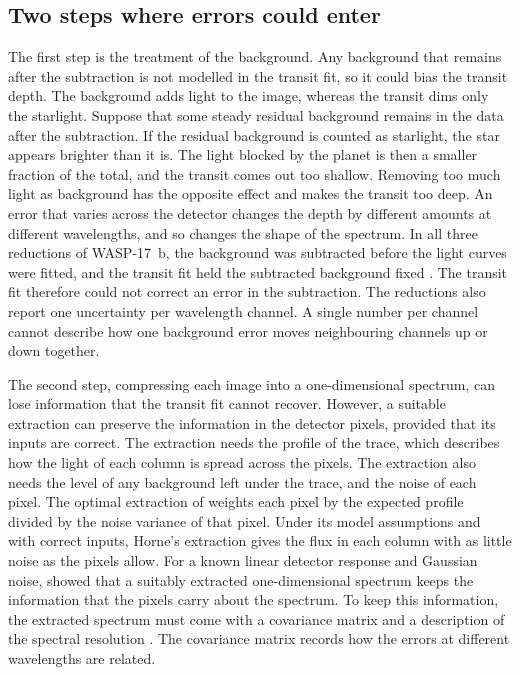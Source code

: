\subsection{Two steps where errors could enter}
\label{sec:structural-limitations}

The first step is the treatment of the background. Any background that remains after the subtraction is not modelled in the transit fit, so it could bias the transit depth. The background adds light to the image, whereas the
transit dims only the starlight. Suppose that some steady residual background
remains in the data after the subtraction. If the residual background is
counted as starlight, the star appears brighter than it is. The light blocked
by the planet is then a smaller fraction of the total, and the transit comes
out too shallow. Removing too much light as background has the opposite
effect and makes the transit too deep. An error that varies across the
detector changes the depth by different amounts at different wavelengths, and
so changes the shape of the spectrum. In all three reductions of WASP-17~b,
the background was subtracted before the light curves were fitted, and the
transit fit held the subtracted background fixed \citep{LouieEtAl2025}. The
transit fit therefore could not correct an error in the subtraction. The
reductions also report one uncertainty per wavelength channel. A single
number per channel cannot describe how one background error moves
neighbouring channels up or down together.

The second step, compressing each image into a one-dimensional spectrum, can
lose information that the transit fit cannot recover. However, a suitable
extraction can preserve the information in the detector pixels, provided that
its inputs are correct. The extraction needs the profile of the trace, which
describes how the light of each column is spread across the pixels. The extraction also needs the level of any background left under the trace, and the noise of each pixel. The optimal
extraction of \citet{Horne1986} weights each pixel by the expected profile
divided by the noise variance of that pixel. Under its model assumptions and
with correct inputs, Horne's extraction gives the flux in each column with as
little noise as the pixels allow. For a known linear detector response and
Gaussian noise, \citet{BoltonSchlegel2010} showed that a suitably extracted
one-dimensional spectrum keeps the information that the pixels carry about
the spectrum. To keep this information, the extracted spectrum must come with
a covariance matrix and a description of the spectral resolution
\citep{BoltonSchlegel2010,BoltonEtAl2012}. The covariance matrix records how
the errors at different wavelengths are related.

